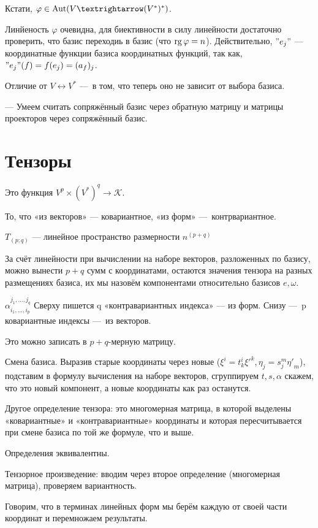 \documentclass[12pt, a4paper]{article}
\begin{document}
Кстати, $\varphi \in \Aut (V → (V^*)^*)$.

Линйеность $\varphi$ очевидна, для биективности в силу линейности 
достаточно проверить, что базис переходиь в базис (что $\operatorname{rg} \varphi = n$).
Действительно, $"e_j"$ — координатные функции базиса координатных функций, 
так как, $"e_j"(f) = f(e_j) = (a_f)_j$.

Отличие от $V \leftrightarrow V^*$ — в том, что теперь оно не зависит от выбора базиса.

— Умеем считать сопряжённый базис через обратную матрицу 
и матрицы проекторов через сопряжённый базис.



\section{Тензоры}

Это функция $V^p × (V^*)^q → \mathcal{K}$.

То, что «из векторов» — ковариантное, «из форм» — контрвариантное.

$T_{(p; q)}$ — линейное пространство размерности $n^(p + q)$

За счёт линейности при вычислении на наборе векторов, разложенных по базису,
можно вынести $p + q$ сумм с координатами, остаются значения тензора 
на разных размещениях базиса, их мы назовём компонентами относительно базисов $e, \omega$.

$\alpha^{j_1, …, j_q}_{i_1, …, i_p}$
Сверху пишется q «контравариантных индекса» — из форм.
Снизу — p ковариантные индексы — из векторов.

Это можно записать в $p + q$-мерную матрицу.

Смена базиса. Выразив старые координаты через новые 
($\xi^i = t^i_k {\xi'}^k, \eta_j = s^m_j {\eta'}_m$), 
подставим в формулу вычисления на наборе векторов, 
сгруппируем $t, s, \alpha$ скажем, что это новый компонент, 
а новые координаты как раз останутся.

Другое определение тензора: это многомерная матрица, 
в которой выделены «ковариантные» и «контравариантные» координаты 
и которая пересчитывается при смене базиса по той же формуле, что и выше.

Определения эквивалентны.

Тензорное произведение: вводим через второе определение 
(многомерная матрица), проверяем вариантность.

Говорим, что в терминах линейных форм мы берём 
каждую от своей части координат и перемножаем результаты.
\end{document}
